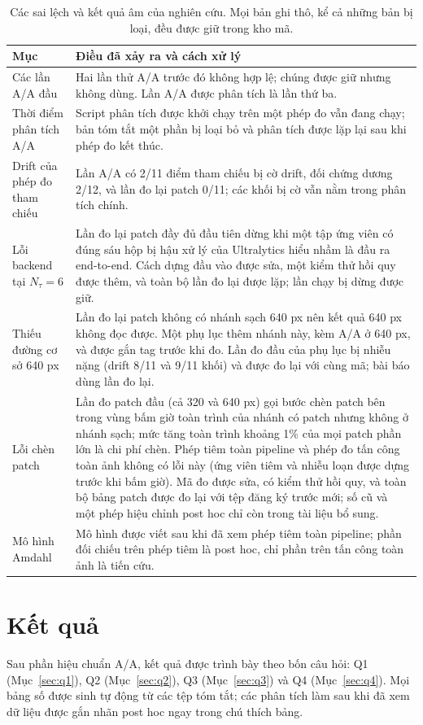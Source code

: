 \documentclass[a4paper,fleqn]{cas-dc}
\newcommand{\Ntau}{N_{\tau}}
\begin{document}
\begin{table}[!tp]
\centering\small
\caption{Các sai lệch và kết quả âm của nghiên cứu. Mọi bản ghi thô, kể cả những bản bị loại, đều được giữ trong kho mã.}
\label{tab:dev}
\begin{tabularx}{\textwidth}{@{}lX@{}}
\toprule
Mục & Điều đã xảy ra và cách xử lý \\
\midrule
Các lần A/A đầu & Hai lần thử A/A trước đó không hợp lệ; chúng được giữ nhưng không dùng. Lần A/A được phân tích là lần thứ ba. \\
Thời điểm phân tích A/A & Script phân tích được khởi chạy trên một phép đo vẫn đang chạy; bản tóm tắt một phần bị loại bỏ và phân tích được lặp lại sau khi phép đo kết thúc. \\
Drift của phép đo tham chiếu & Lần A/A có 2/11 điểm tham chiếu bị cờ drift, đối chứng dương 2/12, và lần đo lại patch 0/11; các khối bị cờ vẫn nằm trong phân tích chính. \\
Lỗi backend tại $\Ntau=6$ & Lần đo lại patch đầy đủ đầu tiên dừng khi một tập ứng viên có đúng sáu hộp bị hậu xử lý của Ultralytics hiểu nhầm là đầu ra end-to-end. Cách dựng đầu vào được sửa, một kiểm thử hồi quy được thêm, và toàn bộ lần đo lại được lặp; lần chạy bị dừng được giữ. \\
Thiếu đường cơ sở 640 px & Lần đo lại patch không có nhánh sạch 640 px nên kết quả 640 px không đọc được. Một phụ lục thêm nhánh này, kèm A/A ở 640 px, và được gắn tag trước khi đo. Lần đo đầu của phụ lục bị nhiễu nặng (drift 8/11 và 9/11 khối) và được đo lại với cùng mã; bài báo dùng lần đo lại. \\
Lỗi chèn patch & Lần đo patch đầu (cả 320 và 640 px) gọi bước chèn patch bên trong vùng bấm giờ toàn trình của nhánh có patch nhưng không ở nhánh sạch; mức tăng toàn trình khoảng 1\% của mọi patch phần lớn là chi phí chèn. Phép tiêm toàn pipeline và phép đo tấn công toàn ảnh không có lỗi này (ứng viên tiêm và nhiễu loạn được dựng trước khi bấm giờ). Mã đo được sửa, có kiểm thử hồi quy, và toàn bộ bảng patch được đo lại với tệp đăng ký trước mới; số cũ và một phép hiệu chỉnh post hoc chỉ còn trong tài liệu bổ sung. \\
Mô hình Amdahl & Mô hình được viết sau khi đã xem phép tiêm toàn pipeline; phần đối chiếu trên phép tiêm là post hoc, chỉ phần trên tấn công toàn ảnh là tiến cứu. \\
\bottomrule
\end{tabularx}
\end{table}


\section{Kết quả}
\label{sec:results}
Sau phần hiệu chuẩn A/A, kết quả được trình bày theo bốn câu hỏi: Q1 (Mục~\ref{sec:q1}), Q2 (Mục~\ref{sec:q2}), Q3 (Mục~\ref{sec:q3}) và Q4 (Mục~\ref{sec:q4}). Mọi bảng số được sinh tự động từ các tệp tóm tắt; các phân tích làm sau khi đã xem dữ liệu được gắn nhãn post hoc ngay trong chú thích bảng.
\end{document}

